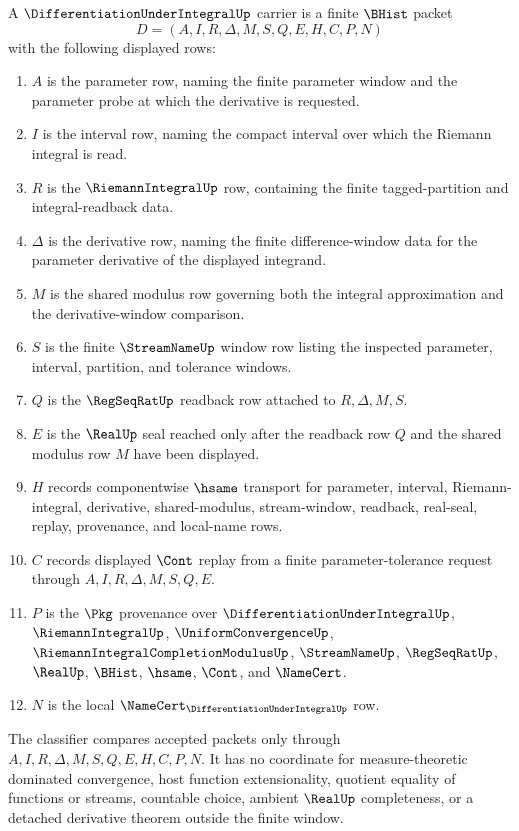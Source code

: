 \begin{definition}
\label{def:differentiation-under-integral-carrier}
A $\DifferentiationUnderIntegralUp$ carrier is a finite $\BHist$ packet
$$
D=(A,I,R,\Delta,M,S,Q,E,H,C,P,N)
$$
with the following displayed rows:
\begin{enumerate}
\item $A$ is the parameter row, naming the finite parameter window and the parameter probe at which the derivative is requested.
\item $I$ is the interval row, naming the compact interval over which the Riemann integral is read.
\item $R$ is the $\RiemannIntegralUp$ row, containing the finite tagged-partition and integral-readback data.
\item $\Delta$ is the derivative row, naming the finite difference-window data for the parameter derivative of the displayed integrand.
\item $M$ is the shared modulus row governing both the integral approximation and the derivative-window comparison.
\item $S$ is the finite $\StreamNameUp$ window row listing the inspected parameter, interval, partition, and tolerance windows.
\item $Q$ is the $\RegSeqRatUp$ readback row attached to $R,\Delta,M,S$.
\item $E$ is the $\RealUp$ seal reached only after the readback row $Q$ and the shared modulus row $M$ have been displayed.
\item $H$ records componentwise $\hsame$ transport for parameter, interval, Riemann-integral, derivative, shared-modulus, stream-window, readback, real-seal, replay, provenance, and local-name rows.
\item $C$ records displayed $\Cont$ replay from a finite parameter-tolerance request through $A,I,R,\Delta,M,S,Q,E$.
\item $P$ is the $\Pkg$ provenance over $\DifferentiationUnderIntegralUp$, $\RiemannIntegralUp$, $\UniformConvergenceUp$, $\RiemannIntegralCompletionModulusUp$, $\StreamNameUp$, $\RegSeqRatUp$, $\RealUp$, $\BHist$, $\hsame$, $\Cont$, and $\NameCert$.
\item $N$ is the local $\NameCert_{\DifferentiationUnderIntegralUp}$ row.
\end{enumerate}
The classifier compares accepted packets only through $A,I,R,\Delta,M,S,Q,E,H,C,P,N$. It has no coordinate for measure-theoretic dominated convergence, host function extensionality, quotient equality of functions or streams, countable choice, ambient $\RealUp$ completeness, or a detached derivative theorem outside the finite window.
\end{definition}

